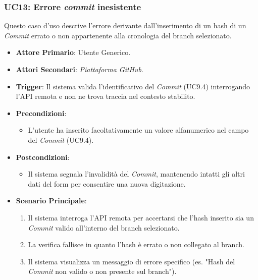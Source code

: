 \documentclass[12pt, a4paper]{article}
\begin{document}
\subsubsection{UC13: Errore \textit{commit} inesistente}\label{uc:13}
Questo caso d'uso descrive l'errore derivante dall'inserimento di un hash di un \textit{Commit} errato o non appartenente alla cronologia del branch selezionato.
\begin{itemize}
    \item \textbf{Attore Primario}: Utente Generico.
    \item \textbf{Attori Secondari}: \textit{Piattaforma GitHub}.
    \item \textbf{Trigger}: Il sistema valida l'identificativo del \textit{Commit} (UC9.4) interrogando l'API remota e non ne trova traccia nel contesto stabilito.
    \item \textbf{Precondizioni}:\begin{itemize}\item L'utente ha inserito facoltativamente un valore alfanumerico nel campo del \textit{Commit} (UC9.4).\end{itemize}
    \item \textbf{Postcondizioni}:\begin{itemize}\item Il sistema segnala l'invalidità del \textit{Commit}, mantenendo intatti gli altri dati del form per consentire una nuova digitazione.\end{itemize}
    \item \textbf{Scenario Principale}:
    \begin{enumerate}
        \item Il sistema interroga l'API remota per accertarsi che l'hash inserito sia un \textit{Commit} valido all'interno del branch selezionato.
        \item La verifica fallisce in quanto l'hash è errato o non collegato al branch.
        \item Il sistema visualizza un messaggio di errore specifico (es. "Hash del \textit{Commit} non valido o non presente sul branch").
    \end{enumerate}
\end{itemize}
\end{document}

